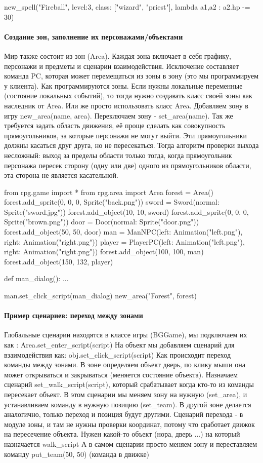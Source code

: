 new\_spell("Fireball", level:3, class: ["wizard", "priest"], lambda a1,a2 : a2.hp -= 30)

\paragraph{Создание зон, заполнение их персонажами/объектами}
Мир также состоит из зон (Area). Каждая зона включает в себя графику, персонажи и предметы и сценарии взаимодействия. Исключение составляет команда PC, которая может перемещаться из зоны в зону (это мы программируем у клиента). Как программируются зоны. Если нужны локальные переменные (состояние локальных событий), то тогда нужно создавать класс своей зоны как наследник от Area. Или же просто использовать класс Area. Добавляем зону в игру new\_area(name, area). Переключаем зону - set\_area(name). Так же требуется задать область движения, её проще сделать как совокупность прямоугольников, за которые персонажи не могут выйти. Эти прямоугольники должны касаться друг друга, но не пересекаться. Тогда алгоритм проверки выхода несложный: выход за пределы области только тогда, когда прямоугольник персонажа пересек сторону (одну или две) одного из прямоугольников области, эта сторона не является касательной.

from rpg.game import *
from rpg.area import Area
forest = Area()
forest.add\_sprite(0, 0, 0, Sprite("back.png"))
sword = Sword(normal: Sprite("sword.jpg"))
forest.add\_object(10, 10, sword)
forest.add\_sprite(0, 0, 0, Sprite("brown.png"))
door = Door(normal: Sprite("door.png"))
forest.add\_object(50, 50, door)
man = ManNPC(left: Animation("left.png"), right: Animation("right.png"))
player = PlayerPC(left: Animation("left.png"), right: Animation("right.png"))
forest.add\_object(100, 100, man)
forest.add\_object(150, 132, player)

def man\_dialog():
...

man.set\_click\_script(man\_dialog)
new\_area("Forest", forest)

\paragraph{Пример сценариев: переход между зонами}
Глобальные сценарии находятся в классе игры (BGGame), мы подключаем их как :
Area.set\_enter\_script(script)
На объект мы добавляем сценарий для взаимодействия как: obj.set\_click\_script(script)
Как происходит переход команды между зонами.
В зоне определяем объект дверь, по клику мыши она может открываться и закрываться (меняется состояние объекта). Назначаем сценарий set\_walk\_script(script), который срабатывает когда кто-то из команды пересекает объект. В этом сценарии мы меняем зону на нужную (set\_area), и устанавливаем команду в нужную позицию (set\_team). В другой зоне делается аналогично, только переход и позиция будут другими.
Сценарий перехода - в модуле зоны, и там не нужны проверки координат, потому что сработает движок на пересечение объекта. Нужен какой-то объект (нора, дверь ...) на который назначается walk\_script
А в самом сценарии просто меняем зону и переставляем команду put\_team(50, 50) (команда в движке)

